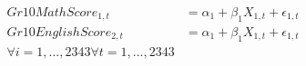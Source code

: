 $$
\begin{aligned}
Gr10MathScore_{1,t} &= \alpha_1 + \beta_1 X_{1,t} + \epsilon_{1,t}  \\
Gr10EnglishScore_{2,t} &= \alpha_1 + \beta_1 X_{1,t} + \epsilon_{1,t} \\
\forall i = 1,...,2343 \forall t = 1,...,2343
\end{aligned}
$$